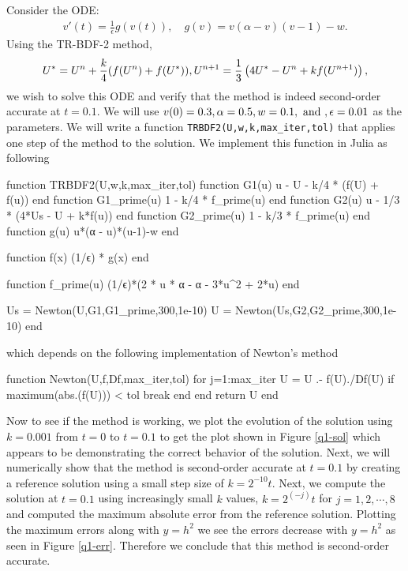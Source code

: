 \documentclass[12pt]{report}
\begin{document}
\begin{solution}

    \noindent
    Consider the ODE:
\begin{align*} v'(t) = \frac 1 \epsilon g(v(t)), \quad g(v) = v (\alpha - v) (v-1) - w. \end{align*}
Using the TR-BDF-2 method,
\begin{equation}\label{TR-BDF-2}
    U^* = U^n + \frac k 4 (f(U^n) + f(U^*)),\\
    U^{n+1} = \frac 1 3 \left( 4 U^* -U^n + k f(U^{n+1})\right),
\end{equation}
we wish to solve this ODE and verify that the method is indeed second-order accurate at $t=0.1$. We will use $v(0)=0.3,\alpha=0.5,w=0.1,{~\text{and}~},{\epsilon}=0.01$ as the parameters. We will write a function \verb+TRBDF2(U,w,k,max_iter,tol)+ that applies one step of the method to the solution. We implement this function in Julia as following
\begin{jllisting}
function TRBDF2(U,w,k,max_iter,tol)
    function G1(u)
        u - U - k/4 * (f(U) + f(u))
    end
    function G1_prime(u)
        1 - k/4 * f_prime(u)
    end
    function G2(u)
        u - 1/3 * (4*Us - U + k*f(u))
    end
    function G2_prime(u)
        1 - k/3 * f_prime(u)
    end
    function g(u)
        u*(α - u)*(u-1)-w
    end
    
    function f(x)
        (1/ϵ) * g(x)
    end
    
    function f_prime(u)
        (1/ϵ)*(2 * u * α - α - 3*u^2 + 2*u)
    end

    Us = Newton(U,G1,G1_prime,300,1e-10)
    U = Newton(Us,G2,G2_prime,300,1e-10)
end
\end{jllisting}
which depends on the following implementation of Newton's method
\begin{jllisting}
function Newton(U,f,Df,max_iter,tol)
    for j=1:max_iter
        U = U .- f(U)./Df(U)
        if maximum(abs.(f(U))) < tol
            break
        end
    end
    return U
end
\end{jllisting}
Now to see if the method is working, we plot the evolution of the solution using $k=0.001$ from $t=0$ to $t=0.1$ to get the plot shown in Figure \ref{q1-sol} which appears to be demonstrating the correct behavior of the solution. Next, we will numerically show that the method is second-order accurate at $t=0.1$ by creating a reference solution using a small step size of $k=2^{-10}t$. Next, we compute the solution at $t=0.1$ using increasingly small $k$ values, $k=2^(-j)t$ for $j=1,2,\cdots,8$ and computed the maximum absolute error from the reference solution. Plotting the maximum errors along with $y=h^2$ we see the errors decrease with $y=h^2$ as seen in Figure \ref{q1-err}. Therefore we conclude that this method is second-order accurate.  


\end{solution}
\end{document}
